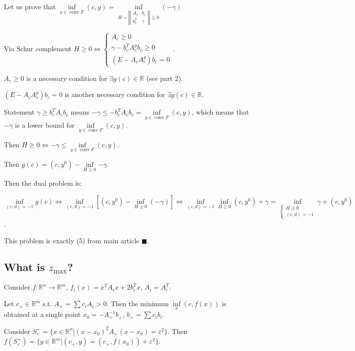 \documentclass[a4paper]{article}
\DeclareMathOperator{\conv}{conv}
\begin{document}
Let us prove that $\inf\limits_{y\in\conv F} (c,y)=\inf\limits_{H=\left|\left|
\begin{array}{cc}
A_c & b_c\\
b_c^T&\gamma
\end{array}
\right|\right|\geqslant 0}(-\gamma)$

Via Schur complement $H\geqslant 0\Leftrightarrow \begin{cases}
A_c\geqslant 0\\
\gamma-b_c^TA_c^gb_c\geqslant 0\\
(E-A_cA_c^g)b_c=0
\end{cases}$.

$A_c\geqslant 0$ is a necessary condition for $\exists g(c) \in\mathbb{R}$ (see part 2).

$(E-A_cA_c^g)b_c=0$ is another necessary condition for $\exists g(c)\in\mathbb{R}$.

Statement $\gamma\geqslant b_c^TA_cb_c$ means $-\gamma\leqslant -b_c^TA_cb_c=\inf\limits_{y\in\conv F}(c,y)$, which means that $-\gamma$ is a lower bound for $\inf\limits_{y\in\conv F}(c,y)$.

Then $H\geqslant 0\Leftrightarrow -\gamma\leqslant \inf\limits_{y\in\conv F}(c,y)$.

Then $g(c)=(c,y^0)-\inf\limits_{H\geqslant 0}{-\gamma}$.

Then the dual problem is:

$\inf\limits_{(c,d)=-1}g(c)\Leftrightarrow \inf\limits_{(c,d)=-1}\left[(c,y^0)-\inf\limits_{H\geqslant 0}(-\gamma)\right]\Leftrightarrow \inf\limits_{(c,d)=-1}\inf\limits_{H\geqslant 0}(c,y^0)+\gamma=\boxed{\inf\limits_{\begin{cases}
H\geqslant 0\\
(c,d)=-1
\end{cases}}\gamma+(c,y^0)}$.

This problem is exactly (5) from main article $\blacksquare$.

\subsection{What is $z_{\max}$?}
\label{norm}
Consider $f\colon\mathbb{R}^n\to\mathbb{R}^m$, $f_i(x)=x^TA_ix+2b_i^Tx$, $A_i=A_i^T$.

Let $c_+\in\mathbb{R}^m$ s.t. $A_+=\sum c_iA_i > 0$. Then the minimum $\inf\limits_x (c,f(x))$ is obtained at a single point $x_0=-A_+^{-1}b_+$, $b_+=\sum c_ib_i$.

Consider $S_\varepsilon^+=\{x\in\mathbb{R}^n\big| (x-x_0)^TA_+(x-x_0)= \varepsilon^2\}$. Then $f(S_\varepsilon^+)=\{y\in\mathbb{R}^m\big| (c_+,y)=(c_+,f(x_0))+\varepsilon^2 \}$.
\end{document}
